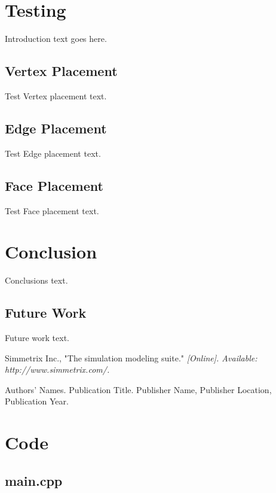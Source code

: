 \documentclass[a4paper, 12pt]{article}
\begin{document}
\section{Testing} \label{sec:testing}
Introduction text goes here.

\subsection{Vertex Placement} \label{subsec:vertexTest}
Test Vertex placement text.

\subsection{Edge Placement} \label{subsec:edgeTest}
Test Edge placement text.

\subsection{Face Placement} \label{subsec:faceTest}
Test Face placement text.

\section{Conclusion} \label{sec:conclusion}
Conclusions text. 

\subsection{Future Work} \label{subsec:future}
Future work text.

\newpage
\begin{thebibliography}{99}

Simmetrix Inc., 
"The simulation modeling suite."
\textit{[Online]. Available: http://www.simmetrix.com/.}


Authors' Names. 
Publication Title.
Publisher Name, Publisher Location, Publication Year.

\end{thebibliography}

\newpage
\appendix
\section{Code} \label{sec:code}

\subsection{main.cpp} \label{subsec:main_cpp}

\end{document}
